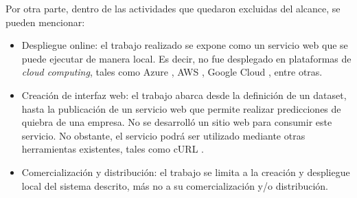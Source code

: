 Por otra parte, dentro de las actividades que quedaron excluidas del alcance, se pueden mencionar:

\begin{itemize}
    \item Despliegue online: el trabajo realizado se expone como un servicio web que se puede ejecutar de manera local. Es decir, no fue desplegado en plataformas de \textit{cloud computing}, tales como Azure \citep{WEBSITE:azure}, AWS \citep{WEBSITE:aws}, Google Cloud \citep{WEBSITE:gcp}, entre otras.
    \item Creación de interfaz web: el trabajo abarca desde la definición de un dataset, hasta la publicación de un servicio web que permite realizar predicciones de quiebra de una empresa. No se desarrolló un sitio web para consumir este servicio. No obstante, el servicio podrá ser utilizado mediante otras herramientas existentes, tales como cURL \citep{WEBSITE:curl}.
    \item Comercialización y distribución: el trabajo se limita a la creación y despliegue local del sistema descrito, más no a su comercialización y/o distribución.
\end{itemize}